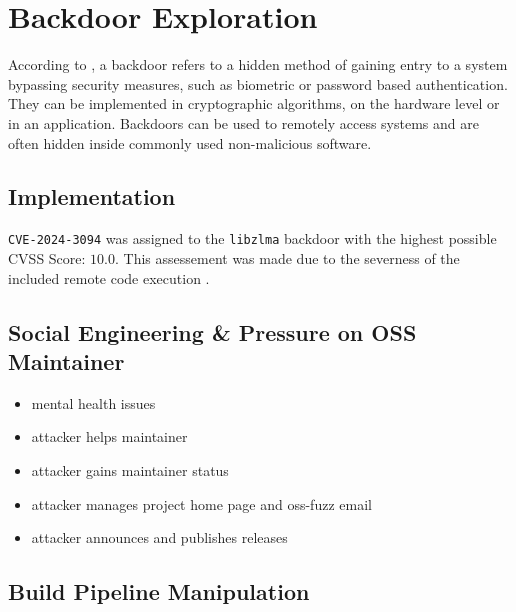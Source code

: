 \section{Backdoor Exploration}

According to \cite{wysopal2007static}, a backdoor refers to a hidden method of
gaining entry to a system bypassing security measures, such as biometric or
password based authentication. They can be implemented in cryptographic
algorithms, on the hardware level or in an application. Backdoors can be used
to remotely access systems and are often hidden inside commonly used
non-malicious software.

\subsection{Implementation}

\texttt{CVE-2024-3094} was assigned to the \texttt{libzlma} backdoor with the
highest possible CVSS Score: $10.0$. This assessement was made due to the
severness of the included remote code execution \cite{redhat2024cve}. 

\subsection{Social Engineering \& Pressure on OSS Maintainer}

\begin{itemize}
    \item mental health issues
    \item attacker helps maintainer
    \item attacker gains maintainer status
    \item attacker manages project home page and oss-fuzz email
    \item attacker announces and publishes releases
\end{itemize}

\subsection{Build Pipeline Manipulation}

